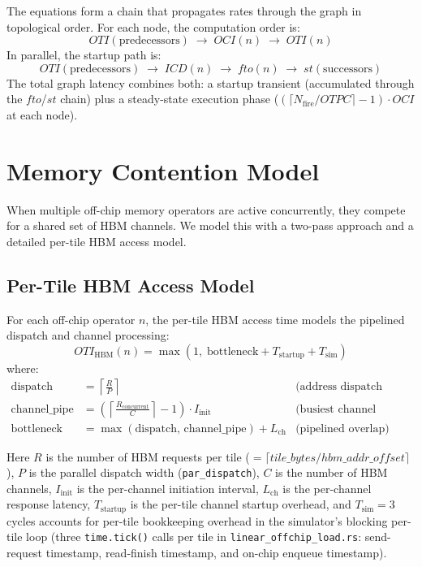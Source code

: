 \documentclass[10pt]{article}
\begin{document}
The equations form a chain that propagates rates through the graph in topological order. For each node, the computation order is:
\[
    \mathit{OTI}(\text{predecessors}) \;\rightarrow\; \mathit{OCI}(n) \;\rightarrow\; \mathit{OTI}(n)
\]
In parallel, the startup path is:
\[
    \mathit{OTI}(\text{predecessors}) \;\rightarrow\; \mathit{ICD}(n) \;\rightarrow\; \mathit{fto}(n) \;\rightarrow\; \mathit{st}(\text{successors})
\]
The total graph latency combines both: a startup transient (accumulated through the $\mathit{fto}$/$\mathit{st}$ chain) plus a steady-state execution phase ($(\lceil N_{\text{fire}} / \mathit{OTPC}\rceil - 1) \cdot \mathit{OCI}$ at each node).

\section{Memory Contention Model}
\label{sec:contention}

When multiple off-chip memory operators are active concurrently, they compete for a shared set of HBM channels. We model this with a two-pass approach and a detailed per-tile HBM access model.

\subsection{Per-Tile HBM Access Model}

For each off-chip operator $n$, the per-tile HBM access time models the pipelined dispatch and channel processing:
\begin{equation}
    \mathit{OTI}_{\text{HBM}}(n) = \max\!\left(1,\; \text{bottleneck} + T_{\text{startup}} + T_{\text{sim}}\right)
\end{equation}
where:
\begin{align}
    \text{dispatch} &= \left\lceil\frac{R}{P}\right\rceil & \text{(address dispatch cycles)} \\
    \text{channel\_pipe} &= \left(\left\lceil\frac{R_{\text{concurrent}}}{C}\right\rceil - 1\right) \cdot I_{\text{init}} & \text{(busiest channel pipeline)} \\
    \text{bottleneck} &= \max(\text{dispatch},\, \text{channel\_pipe}) + L_{\text{ch}} & \text{(pipelined overlap)}
\end{align}

Here $R$ is the number of HBM requests per tile ($= \lceil\mathit{tile\_bytes} / \mathit{hbm\_addr\_offset}\rceil$), $P$ is the parallel dispatch width (\texttt{par\_dispatch}), $C$ is the number of HBM channels, $I_{\text{init}}$ is the per-channel initiation interval, $L_{\text{ch}}$ is the per-channel response latency, $T_{\text{startup}}$ is the per-tile channel startup overhead, and $T_{\text{sim}} = 3$ cycles accounts for per-tile bookkeeping overhead in the simulator's blocking per-tile loop (three \texttt{time.tick()} calls per tile in \texttt{linear\_offchip\_load.rs}: send-request timestamp, read-finish timestamp, and on-chip enqueue timestamp).
\end{document}
